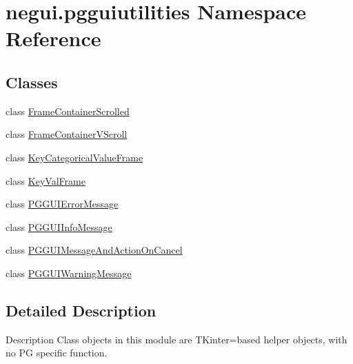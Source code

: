 \hypertarget{namespacenegui_1_1pgguiutilities}{}\section{negui.\+pgguiutilities Namespace Reference}
\label{namespacenegui_1_1pgguiutilities}
\subsection*{Classes}
\begin{DoxyCompactItemize}
\item 
class \hyperlink{classnegui_1_1pgguiutilities_1_1FrameContainerScrolled}{Frame\+Container\+Scrolled}
\item 
class \hyperlink{classnegui_1_1pgguiutilities_1_1FrameContainerVScroll}{Frame\+Container\+V\+Scroll}
\item 
class \hyperlink{classnegui_1_1pgguiutilities_1_1KeyCategoricalValueFrame}{Key\+Categorical\+Value\+Frame}
\item 
class \hyperlink{classnegui_1_1pgguiutilities_1_1KeyValFrame}{Key\+Val\+Frame}
\item 
class \hyperlink{classnegui_1_1pgguiutilities_1_1PGGUIErrorMessage}{P\+G\+G\+U\+I\+Error\+Message}
\item 
class \hyperlink{classnegui_1_1pgguiutilities_1_1PGGUIInfoMessage}{P\+G\+G\+U\+I\+Info\+Message}
\item 
class \hyperlink{classnegui_1_1pgguiutilities_1_1PGGUIMessageAndActionOnCancel}{P\+G\+G\+U\+I\+Message\+And\+Action\+On\+Cancel}
\item 
class \hyperlink{classnegui_1_1pgguiutilities_1_1PGGUIWarningMessage}{P\+G\+G\+U\+I\+Warning\+Message}
\end{DoxyCompactItemize}


\subsection{Detailed Description}
\begin{DoxyVerb}Description
Class objects in this module are TKinter=based
helper objects, with no PG specific function.\end{DoxyVerb}
 